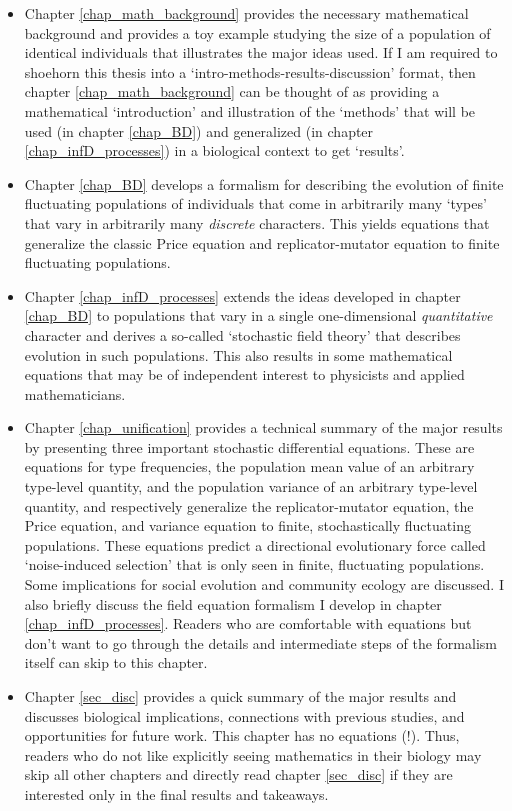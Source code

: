 \begin{itemize}
		\item Chapter \ref{chap_math_background} provides the necessary mathematical background and provides a toy example studying the size of a population of identical individuals that illustrates the major ideas used. If I am required to shoehorn this thesis into a `intro-methods-results-discussion' format, then chapter \ref{chap_math_background} can be thought of as providing a mathematical `introduction' and illustration of the `methods' that will be used (in chapter \ref{chap_BD}) and generalized (in chapter \ref{chap_infD_processes}) in a biological context to get `results'.
		\item Chapter \ref{chap_BD} develops a formalism for describing the evolution of finite fluctuating populations of individuals that come in arbitrarily many `types' that vary in arbitrarily many \emph{discrete} characters. This yields equations that generalize the classic Price equation and replicator-mutator equation to finite fluctuating populations.
		\item Chapter \ref{chap_infD_processes} extends the ideas developed in chapter \ref{chap_BD} to populations that vary in a single one-dimensional \emph{quantitative} character and derives a so-called `stochastic field theory' that describes evolution in such populations. This also results in some mathematical equations that may be of independent interest to physicists and applied mathematicians.
		\item Chapter \ref{chap_unification} provides a technical summary of the major results by presenting three important stochastic differential equations. These are equations for type frequencies, the population mean value of an arbitrary type-level quantity, and the population variance of an arbitrary type-level quantity, and respectively generalize the replicator-mutator equation, the Price equation, and  variance equation to finite, stochastically fluctuating populations. These equations predict a directional evolutionary force called `noise-induced selection' that is only seen in finite, fluctuating populations. Some implications for social evolution and community ecology are discussed. I also briefly discuss the field equation formalism I develop in chapter \ref{chap_infD_processes}. Readers who are comfortable with equations but don't want to go through the details and intermediate steps of the formalism itself can skip to this chapter.
		\item Chapter \ref{sec_disc} provides a quick summary of the major results and discusses biological implications, connections with previous studies, and opportunities for future work. This chapter has no equations (!). Thus, readers who do not like explicitly seeing mathematics in their biology may skip all other chapters and directly read chapter \ref{sec_disc} if they are interested only in the final results and takeaways. 
\end{itemize}
